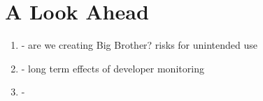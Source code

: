\section{A Look Ahead}

  \begin{enumerate}
  \item - are we creating Big Brother? risks for unintended use
  \item - long term effects of developer monitoring 
  \item - 
  \end{enumerate}